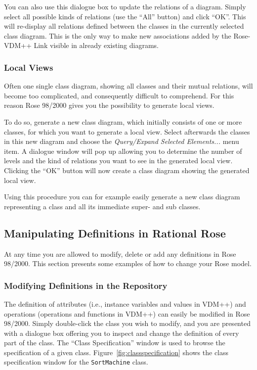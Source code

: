 \documentclass[\pformat,12pt]{article}
\newcommand{\vdmpp}{VDM++}
\newcommand{\link}{Rose-\vdmpp{} Link}
\newcommand{\rose}{Rose 98/2000}
\begin{document}
You can also use this dialogue box to update the relations of a
diagram. Simply select all possible kinds of relations (use the
``All'' button) and click ``OK''. This will re-display all relations
defined between the classes in the currently selected class diagram.
This is the only way to make new associations added by the \link{}
  visible in already existing diagrams.

\subsubsection*{Local Views}
Often one single class diagram, showing all classes and their mutual relations, will become too   
complicated, and consequently difficult to comprehend. For this reason  
\rose{} gives you the possibility to generate local views.

To do so, generate a new class diagram, which initially consists of one
or more classes, for which you want to generate a local view.  Select afterwards the
classes in this new diagram and choose the {\it Query/Expand Selected
  Elements...} menu item. A dialogue window will pop up allowing you
to determine the number of levels and the kind of relations you want
to see in the generated local view.
Clicking the ``OK'' button will now create a class diagram showing the generated local view.

Using this procedure you can for example easily generate a new class diagram
representing a class and all its immediate super- and sub classes.

\subsection{Manipulating Definitions in Rational Rose}
\label{manipulate}
  
At any time you are allowed to modify, delete or add any definitions in \rose{}. 
This section presents some examples of how to change your Rose model.

\subsubsection*{Modifying Definitions in the Repository}
  
The definition of attributes (i.e., instance variables and values
in \vdmpp{}) and operations (operations and functions
in \vdmpp{}) can easily be modified in \rose{}. Simply double-click
the class you wish to modify, and you are presented with a dialogue
box offering you to inspect and change the definition of every part of
the class.  The ``Class Specification'' window is used to browse the
specification of a given class. Figure~\ref{fig:classspecification}
shows the class specification window for the {\tt SortMachine} class.
\end{document}
